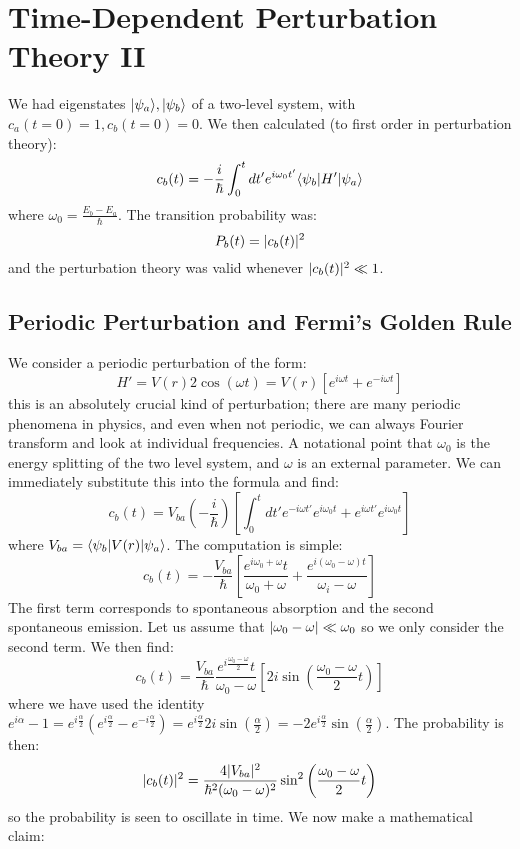 \section{Time-Dependent Perturbation Theory II}
We had eigenstates $\lvert \psi_a \rangle, \lvert \psi_b \rangle$ of a two-level system, with $c_a(t = 0) = 1, c_b(t = 0) = 0$. We then calculated (to first order in perturbation theory):
\begin{equation}
    c_b(t) = -\frac{i}{\hbar}\int_0^t dt' e^{i\omega_0 t'}\langle \psi_b \rvert H'\lvert \psi_a \rangle
\end{equation}
where $\omega_0 = \frac{E_b - E_a}{\hbar}$. The transition probability was:
\begin{equation}
    P_b(t) = \lvert c_b(t) \rvert^2
\end{equation}
and the perturbation theory was valid whenever $\lvert c_b(t) \rvert^2 \ll 1$.

\subsection{Periodic Perturbation and Fermi's Golden Rule}
We consider a periodic perturbation of the form:
\begin{equation}
    H' = V(r)2\cos(\omega t)  = V(r)\left[e^{i\omega t} + e^{-i\omega t}\right]
\end{equation}
this is an absolutely crucial kind of perturbation; there are many periodic phenomena in physics, and even when not periodic, we can always Fourier transform and look at individual frequencies. A notational point that $\omega_0$ is the energy splitting of the two level system, and $\omega$ is an external parameter. We can immediately substitute this into the formula and find:
\begin{equation}
    c_b(t) = V_{ba}\left(-\frac{i}{\hbar}\right)\left[\int_0^t dt' e^{-i\omega t'}e^{i\omega_0 t} + e^{i\omega t'}e^{i\omega_0 t}\right]
\end{equation}
where $V_{ba} = \langle \psi_b \rvert V(r)\lvert \psi_a \rangle$. The computation is simple:
\begin{equation}
    c_b(t) = -\frac{V_{ba}}{\hbar}\left[\frac{e^{i\omega_0 + \omega}t}{\omega_0 + \omega} + \frac{e^{i(\omega_0 - \omega)t}}{\omega_i - \omega}\right]
\end{equation}
The first term corresponds to spontaneous absorption and the second spontaneous emission. Let us assume that $\lvert \omega_0 - \omega \rvert \ll \omega_0$ so we only consider the second term. We then find:
\begin{equation}
    c_b(t) = \frac{V_{ba}}{\hbar}\frac{e^{i\frac{\omega_0 - \omega}{2}}t}{\omega_0 - \omega}\left[2i\sin(\frac{\omega_0 - \omega}{2}t)\right]
\end{equation}
where we have used the identity $e^{i\alpha} - 1 = e^{i\frac{\alpha}{2}}\left(e^{i\frac{\alpha}{2}} - e^{-i\frac{\alpha}{2}}\right) = e^{i\frac{\alpha}{2}}2i\sin(\frac{\alpha}{2}) = -2e^{i\frac{\alpha}{2}}\sin(\frac{\alpha}{2})$. The probability is then:
\begin{equation}
    \lvert c_b(t) \rvert^2 = \frac{4\lvert V_{ba} \rvert^2}{\hbar^2(\omega_0 - \omega)^2}\sin^2\left(\frac{\omega_0 - \omega}{2}t\right)
\end{equation}
so the probability is seen to oscillate in time. We now make a mathematical claim:

